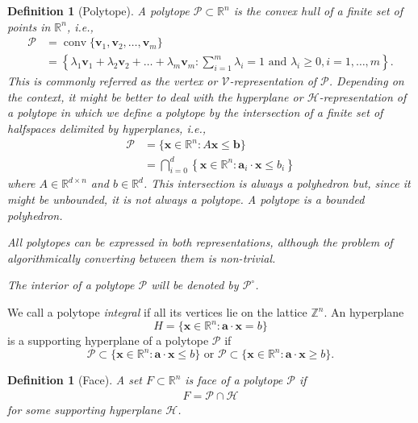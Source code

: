 \documentclass[a4paper,11pt,reqno]{amsart}
\DeclareMathOperator{\conv}{conv}
\newtheorem{definition}[theorem]{Definition}
\begin{document}
\begin{definition}[Polytope]
A polytope $\mathcal{P} \subset \mathbb{R}^n$ is the convex hull of a finite set of points in $\mathbb{R}^n$, i.e.,
\begin{align*}
\mathcal{P} &=\conv \{\bm{v}_1, \bm{v}_2, \dots, \bm{v}_m\} \\
&=\left\{ \lambda_1 \bm{v}_1 + \lambda_2 \bm{v}_2 + \dots + \lambda_m \bm{v}_m : 
\sum_{i=1}^m \lambda_i = 1 \text{ and } \lambda_i \geq 0, i=1,\dots,m \right\}.
\end{align*}
This is commonly referred as the vertex or $\mathcal{V}$-representation of $\mathcal{P}$. Depending on the context, 
it might be better to deal with the hyperplane or $\mathcal{H}$-representation of a polytope in which we define a 
polytope by the intersection of a finite set of halfspaces delimited by hyperplanes, i.e.,
\begin{align*}
\mathcal{P} &=\{\bm{x} \in \mathbb{R}^n : A \bm{x} \leq  \bm{b}\} \\
&= \bigcap_{i=0}^d \left\{ \bm{x} \in \mathbb{R}^n : \bm{a}_i \cdot  \bm{x}   \leq b_i \right\}
\end{align*}
where $A \in \mathbb{R}^{d \times n}$ and $b \in \mathbb{R}^d$. This intersection is always a polyhedron but, 
since it might be unbounded, it is not always a polytope. A polytope is a bounded polyhedron.
	
All polytopes can be expressed in both representations, although the problem of algorithmically converting 
between them is non-trivial. 

The interior of a polytope $\mathcal{P}$ will be denoted by $\mathcal{P}^\circ$.
\end{definition}

We call a polytope \emph{integral} if all its vertices lie on the lattice $\mathbb{Z}^n$. 
An hyperplane 
\[
H=\{\bm{x} \in \mathbb{R}^n : \bm{a} \cdot \bm{x} =b\}
\]
is a supporting hyperplane of a polytope $\mathcal{P}$ if
\[
\mathcal{P} \subset \{\bm{x} \in \mathbb{R}^n : \bm{a} \cdot \bm{x} \leq b\} \text{ or } \mathcal{P} \subset \{\bm{x} \in \mathbb{R}^n : 
\bm{a} \cdot \bm{x} \geq b\}.
\]

\begin{definition}[Face]
A set $F \subset \mathbb{R}^n$ is face of a polytope $\mathcal{P}$ if
\begin{align*}
F=\mathcal{P} \cap \mathcal{H}
\end{align*}
for some supporting hyperplane $\mathcal{H}$.
\end{definition}
\end{document}
